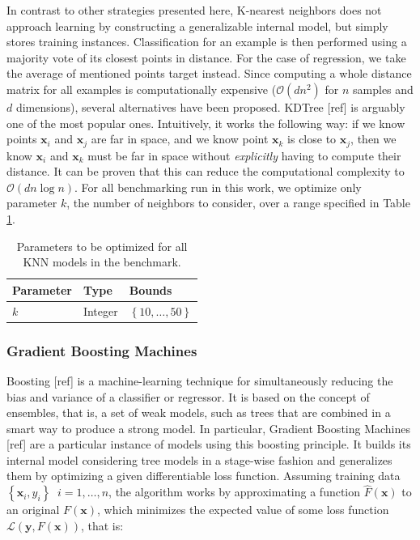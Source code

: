 \documentclass[10pt,a4paper,twoside]{book}
\begin{document}
In contrast to other strategies presented here, K-nearest neighbors does not approach learning by constructing a generalizable internal model, but simply stores training instances. Classification for an example is then performed using a majority vote of its closest points in distance. For the case of regression, we take the average of mentioned points target instead. Since computing a whole distance matrix for all examples is computationally expensive ($\mathcal{O}(dn^2)$ for $n$ samples and $d$ dimensions), several alternatives have been proposed. KDTree [ref] is arguably one of the most popular ones. Intuitively, it works the following way: if we know points $\boldsymbol{x}_i$ and $\boldsymbol{x}_j$ are far in space, and we know point $\boldsymbol{x}_k$ is close to $\boldsymbol{x}_j$, then we know $\boldsymbol{x}_i$ and $\boldsymbol{x}_k$ must be far in space without \textit{explicitly} having to compute their distance. It can be proven that this can reduce the computational complexity to $\mathcal{O}(dn\log n)$. For all benchmarking run in this work, we optimize only parameter $k$, the number of neighbors to consider, over a range specified in Table \ref{knnparams}.

\begin{table}[]
\centering
\caption{Parameters to be optimized for all KNN models in the benchmark.}
\label{knnparams}
\begin{tabular}{@{}lll@{}}
\toprule
\textbf{Parameter} & \textbf{Type} & \textbf{Bounds}                           \\ \midrule
$k$                & Integer       & $\left\lbrace 10, \dots,50 \right\rbrace$
\end{tabular}
\end{table}

\subsubsection{Gradient Boosting Machines}

Boosting [ref] is a machine-learning technique for simultaneously reducing the bias and variance of a classifier or regressor. It is based on the concept of ensembles, that is, a set of weak models, such as trees that are combined in a smart way to produce a strong model. In particular, Gradient Boosting Machines [ref] are a particular instance of models using this boosting principle. It builds its internal model considering tree models in a stage-wise fashion and generalizes them by optimizing a given differentiable loss function. Assuming training data $\left\lbrace \boldsymbol{x}_i, y_i\right\rbrace\;\; i=1,\dots,n$, the algorithm works by approximating a function $\hat{F}(\boldsymbol{x})$ to an original $F(\boldsymbol{x})$, which minimizes the expected value of some loss function $\mathcal{L}\left(\boldsymbol{y}, F(\boldsymbol{x})\right)$, that is:
\end{document}
